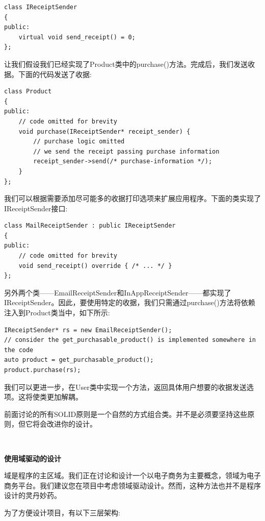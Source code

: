 \begin{lstlisting}[caption={}]
class IReceiptSender
{
public:
	virtual void send_receipt() = 0;
};
\end{lstlisting}

让我们假设我们已经实现了Product类中的purchase()方法。完成后，我们发送收据。下面的代码发送了收据: \par

\begin{lstlisting}[caption={}]
class Product
{
public:
	// code omitted for brevity
	void purchase(IReceiptSender* receipt_sender) {
		// purchase logic omitted
		// we send the receipt passing purchase information
		receipt_sender->send(/* purchase-information */);
	}
};
\end{lstlisting}

我们可以根据需要添加尽可能多的收据打印选项来扩展应用程序。下面的类实现了IReceiptSender接口: \par

\begin{lstlisting}[caption={}]
class MailReceiptSender : public IReceiptSender
{
public:
	// code omitted for brevity
	void send_receipt() override { /* ... */ }
};
\end{lstlisting}

另外两个类——EmailReceiptSender和InAppReceiptSender——都实现了IReceiptSender。因此，要使用特定的收据，我们只需通过purchase()方法将依赖注入到Product类当中，如下所示: \par

\begin{lstlisting}[caption={}]
IReceiptSender* rs = new EmailReceiptSender();
// consider the get_purchasable_product() is implemented somewhere in the code
auto product = get_purchasable_product();
product.purchase(rs);
\end{lstlisting}

我们可以更进一步，在User类中实现一个方法，返回具体用户想要的收据发送选项。这将使类更加解耦。 \par
前面讨论的所有SOLID原则是一个自然的方式组合类。并不是必须要坚持这些原则，但它将会改进你的设计。 \par

\noindent\textbf{}\ \par
\textbf{使用域驱动的设计} \ \par
域是程序的主区域。我们正在讨论和设计一个以电子商务为主要概念，领域为电子商务平台。我们建议您在项目中考虑领域驱动设计。然而，这种方法也并不是程序设计的灵丹妙药。 \par
为了方便设计项目，有以下三层架构: \par

